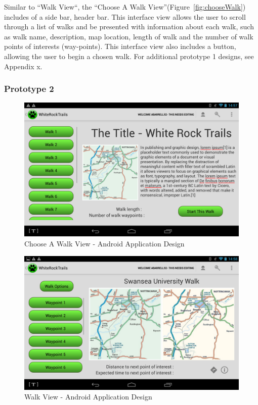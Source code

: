\documentclass[11pt,a4paper]{article}
\begin{document}
Similar to ``Walk View``, the ``Choose A Walk View''(Figure~\ref{fig:chooseWalk}) includes of a side bar, header bar. This interface view allows the user to scroll through a list of walks and be presented with information about each walk, such as walk name, description, map location, length of walk and the number of walk points of interests (way-points). This interface view also includes a button, allowing the user to begin a chosen walk. For additional prototype 1 designs, see Appendix x.

\subsubsection{Prototype 2}

\begin{figure}[h!]
\begin{center}
\includegraphics[width=12cm]{./img/app_choose_walk.png}
\caption{Choose A Walk View - Android Application Design}
\label{fig:appChoose}
\end{center}
\end{figure}


\begin{figure}[h!]
\begin{center}
\includegraphics[width=12cm]{./img/app_walk_view.png}
\caption{Walk View - Android Application Design}
\label{fig:appWalk}
\end{center}
\end{figure}
\end{document}

